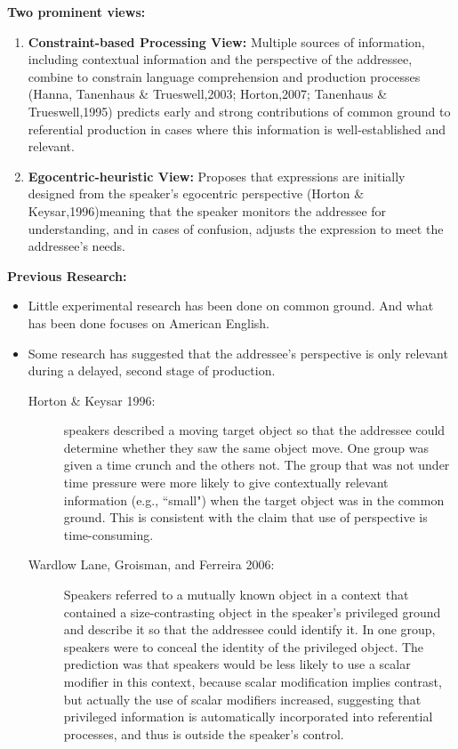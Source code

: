 \documentclass{article}
\begin{document}
\begin{multicols}{2}
\textbf{Two prominent views:}
\begin{enumerate}
	\item \textbf{Constraint-based Processing View:} Multiple sources of information, including contextual information and the perspective of the addressee, combine to constrain language comprehension and production processes (Hanna, Tanenhaus \& Trueswell,2003; Horton,2007; Tanenhaus \& Trueswell,1995) predicts early and strong contributions of common ground to referential production in cases where this information is well-established and relevant.
	\item \textbf{Egocentric-heuristic View:} Proposes that expressions are initially designed from the speaker's egocentric perspective (Horton \& Keysar,1996)\textemdash meaning that the speaker monitors the addressee for understanding, and in cases of confusion, adjusts the expression to meet the addressee’s needs.
\end{enumerate}
\textbf{Previous Research:}
	\begin{itemize}
	\item Little experimental research has been done on common ground. And what has been done focuses on American English.
	\item Some research has suggested that the addressee's perspective is only relevant during a delayed, second stage of production.
	\begin{description}
		\item[Horton \& Keysar 1996:] speakers described a moving target object so that the addressee could determine whether they saw the same object move. One group was given a time crunch and the others not. The group that was not under time pressure were more likely to give contextually relevant information (e.g., \textquotedblleft small") when the target object was in the common ground. This is consistent with the claim that use of perspective is time-consuming. 
		\item[Wardlow Lane, Groisman, and Ferreira 2006:] Speakers referred to a mutually known object in a context that contained a size-contrasting object in the speaker’s privileged ground and describe it so that the addressee could identify it. In one group, speakers were to conceal the identity of the privileged object. The prediction was that speakers would be less likely to use a scalar modifier in this context, because scalar modification implies contrast, but actually the use of scalar modifiers increased, suggesting that privileged information is automatically incorporated into referential processes, and thus is outside the speaker's control.

\end{description}
\end{itemize}
\end{multicols}
\end{document}
